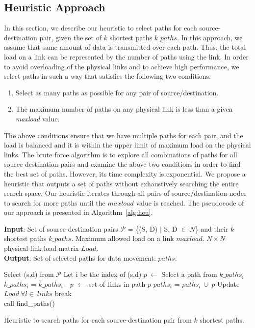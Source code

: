 \subsection{Heuristic Approach}
\label{sec:heuristic}

In this section, we describe our heuristic to select paths for each source-destination pair, given the set of $k$ shortest paths $k\_paths$. In this approach, we assume that same amount of data is transmitted over each path. Thus, the total load on a link can be represented by the number of paths using the link. In order to avoid overloading of the physical links and to achieve high performance, we select paths in such a way that satisfies the following two conditions:
\begin{enumerate}
\item Select as many paths as possible for any pair of source/destination. 
\item The maximum number of paths on any physical link is less than a given \textit{maxload} value.
\end{enumerate}
The above conditions ensure that we have multiple paths for each pair, and the load is balanced and it is within the upper limit of maximum load on the physical links. The brute force algorithm is to explore all combinations of paths for all source-destination pairs and examine the above two conditions in order to find the best set of paths. However, its time complexity is exponential. We propose a heuristic that outputs a set of paths without exhaustively searching the entire search space. Our heuristic iterates through all pairs of source/destination nodes to search for more paths until the $maxload$ value is reached. The pseudocode of our approach is presented in Algorithm~\ref{alg:heu}. 
\begin{algorithm}[!htbp]
\textbf{Input}: Set of source-destination pairs $\mathcal{P}$ = \{(S, D) $|$ S, D $\in~N$\} and their $k$ shortest paths {$k\_paths$}. Maximum allowed load on a link $maxload$. $N\times N$ physical link load matrix $Load$.\\
\textbf{Output}: Set of selected paths for data movement: {$paths$}.\\
\begin{algorithmic}
		\State Select (s,d) from $\mathcal{P}$ 
		\State Let i be the index of (s,d) 
		\State $p~\leftarrow$ Select a path from $k\_paths_i$ 
		\State $k\_paths_i$ = $k\_paths_i$ - {$p$} 
		 $\leftarrow$ set of links in path $p$ 
			\State $paths_i$ = $paths_i~\cup~{p}$ 
			\State Update $Load~\forall l\in~links$ 
		\EndIf
			\State break 
		\EndIf
	\EndWhile
 \EndFunction
~\\
	\While {($~$)} 
		\State call find\_paths() 
	\EndWhile
 \EndFunction
\end{algorithmic}

\caption{Heuristic to search paths for each source-destination pair from $k$ shortest paths.}
\label{alg:heu}
\end{algorithm}
